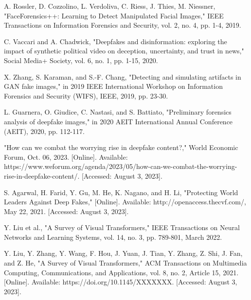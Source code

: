 \begin{thebibliography}{99}
        \item\label{ref1} A. Rossler, D. Cozzolino, L. Verdoliva, C. Riess, J. Thies, M. Niessner, "FaceForensics++: Learning to Detect Manipulated Facial Images," IEEE Transactions on Information Forensics and Security, vol. 2, no. 4, pp. 1-4, 2019.

        \item\label{ref2} C. Vaccari and A. Chadwick, "Deepfakes and disinformation: exploring the impact of synthetic political video on deception, uncertainty, and trust in news," Social Media+ Society, vol. 6, no. 1, pp. 1-15, 2020.
        
        \item\label{ref3} X. Zhang, S. Karaman, and S.-F. Chang, "Detecting and simulating artifacts in GAN fake images," in 2019 IEEE International Workshop on Information Forensics and Security (WIFS), IEEE, 2019, pp. 23-30.
        
        \item\label{ref4} L. Guarnera, O. Giudice, C. Nastasi, and S. Battiato, "Preliminary forensics analysis of deepfake images," in 2020 AEIT International Annual Conference (AEIT), 2020, pp. 112-117.
        
        \item\label{ref5} "How can we combat the worrying rise in deepfake content?," World Economic Forum, Oct. 06, 2023. [Online]. Available: https://www.weforum.org/agenda/2023/05/how-can-we-combat-the-worrying-rise-in-deepfake-content/. [Accessed: August 3, 2023].
        
        \item\label{ref6} S. Agarwal, H. Farid, Y. Gu, M. He, K. Nagano, and H. Li, "Protecting World Leaders Against Deep Fakes," [Online]. Available: http://openaccess.thecvf.com/, May 22, 2021. [Accessed: August 3, 2023].
        
        \item\label{ref7} Y. Liu et al., "A Survey of Visual Transformers," IEEE Transactions on Neural Networks and Learning Systems, vol. 14, no. 3, pp. 789-801, March 2022.
        
        \item\label{ref8} Y. Liu, Y. Zhang, Y. Wang, F. Hou, J. Yuan, J. Tian, Y. Zhang, Z. Shi, J. Fan, and Z. He, "A Survey of Visual Transformers," ACM Transactions on Multimedia Computing, Communications, and Applications, vol. 8, no. 2, Article 15, 2021. [Online]. Available: https://doi.org/10.1145/XXXXXXX. [Accessed: August 3, 2023].
        

\end{thebibliography}
